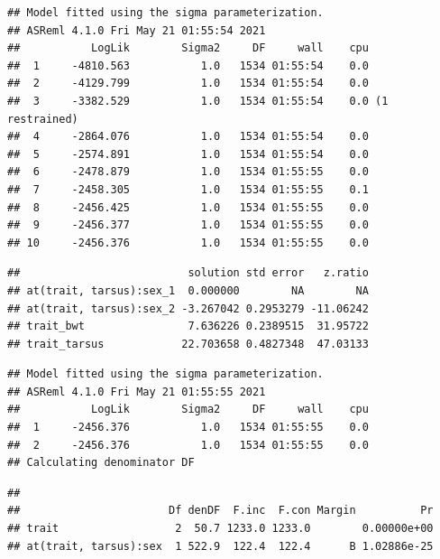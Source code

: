 \documentclass[
  12pt,
]{book}
\newenvironment{Shaded}{\begin{snugshade}}{\end{snugshade}}
\newcommand{\AttributeTok}[1]{\textcolor[rgb]{0.77,0.63,0.00}{#1}}
\newcommand{\ConstantTok}[1]{\textcolor[rgb]{0.00,0.00,0.00}{#1}}
\newcommand{\FunctionTok}[1]{\textcolor[rgb]{0.00,0.00,0.00}{#1}}
\newcommand{\NormalTok}[1]{#1}
\newcommand{\SpecialCharTok}[1]{\textcolor[rgb]{0.00,0.00,0.00}{#1}}
\newcommand{\StringTok}[1]{\textcolor[rgb]{0.31,0.60,0.02}{#1}}
\begin{document}
\begin{verbatim}
## Model fitted using the sigma parameterization.
## ASReml 4.1.0 Fri May 21 01:55:54 2021
##           LogLik        Sigma2     DF     wall    cpu
##  1     -4810.563           1.0   1534 01:55:54    0.0
##  2     -4129.799           1.0   1534 01:55:54    0.0
##  3     -3382.529           1.0   1534 01:55:54    0.0 (1 restrained)
##  4     -2864.076           1.0   1534 01:55:54    0.0
##  5     -2574.891           1.0   1534 01:55:54    0.0
##  6     -2478.879           1.0   1534 01:55:55    0.0
##  7     -2458.305           1.0   1534 01:55:55    0.1
##  8     -2456.425           1.0   1534 01:55:55    0.0
##  9     -2456.377           1.0   1534 01:55:55    0.0
## 10     -2456.376           1.0   1534 01:55:55    0.0
\end{verbatim}

\begin{Shaded}
\end{Shaded}

\begin{verbatim}
##                          solution std error   z.ratio
## at(trait, tarsus):sex_1  0.000000        NA        NA
## at(trait, tarsus):sex_2 -3.267042 0.2953279 -11.06242
## trait_bwt                7.636226 0.2389515  31.95722
## trait_tarsus            22.703658 0.4827348  47.03133
\end{verbatim}

\begin{verbatim}
## Model fitted using the sigma parameterization.
## ASReml 4.1.0 Fri May 21 01:55:55 2021
##           LogLik        Sigma2     DF     wall    cpu
##  1     -2456.376           1.0   1534 01:55:55    0.0
##  2     -2456.376           1.0   1534 01:55:55    0.0
## Calculating denominator DF
\end{verbatim}

\begin{verbatim}
## 
##                       Df denDF  F.inc  F.con Margin          Pr
## trait                  2  50.7 1233.0 1233.0        0.00000e+00
## at(trait, tarsus):sex  1 522.9  122.4  122.4      B 1.02886e-25
\end{verbatim}
\end{document}

